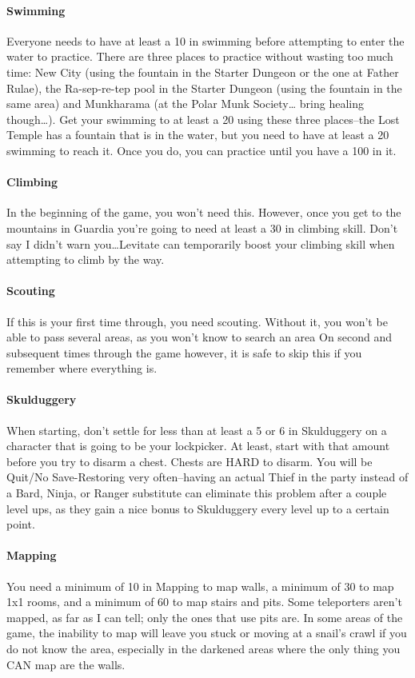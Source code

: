 \documentclass[12pt]{article}
\let\oldparagraph\paragraph
\renewcommand{\paragraph}[1]{\oldparagraph{#1}\mbox{}}
\begin{document}
\paragraph{Swimming} Everyone needs to have at least a 10 in swimming before
attempting to enter the water to practice. There are three places to practice
without wasting too much time: New City (using the fountain in the Starter
Dungeon or the one at Father Rulae), the Ra-sep-re-tep pool in the Starter
Dungeon (using the fountain in the same area) and Munkharama (at the Polar
Munk Society\ldots{} bring healing though\ldots{}). Get your swimming to at
least a 20 using these three places--the Lost Temple has a fountain that is
in the water, but you need to have at least a 20 swimming to reach it. Once
you do, you can practice until you have a 100 in it.

\paragraph{Climbing} In the beginning of the game, you won't need
this. However, once you get to the mountains in Guardia you're going to need
at least a 30 in climbing skill. Don't say I didn't warn you\ldots{}Levitate
can temporarily boost your climbing skill when attempting to climb by the
way.

\paragraph{Scouting} If this is your first time through, you need
scouting. Without it, you won't be able to pass several areas, as you won't
know to search an area On second and subsequent times through the game
however, it is safe to skip this if you remember where everything is.

\paragraph{Skulduggery} When starting, don't settle for less than at least a
5 or 6 in Skulduggery on a character that is going to be your lockpicker. At
least, start with that amount before you try to disarm a chest. Chests are
HARD to disarm. You will be Quit/No Save-Restoring very often--having an
actual Thief in the party instead of a Bard, Ninja, or Ranger substitute can
eliminate this problem after a couple level ups, as they gain a nice bonus to
Skulduggery every level up to a certain point.

\paragraph{Mapping} You need a minimum of 10 in Mapping to map walls, a
minimum of 30 to map 1x1 rooms, and a minimum of 60 to map stairs and
pits. Some teleporters aren't mapped, as far as I can tell; only the ones
that use pits are. In some areas of the game, the inability to map will leave
you stuck or moving at a snail's crawl if you do not know the area,
especially in the darkened areas where the only thing you CAN map are the
walls.
\end{document}
